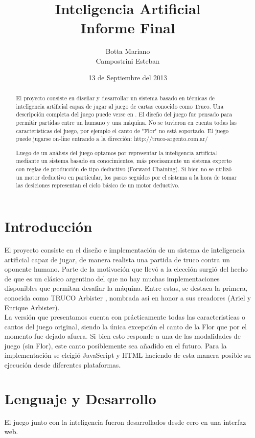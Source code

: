 \documentclass[12pt,a4paper]{article}
\title{Inteligencia Artificial\\ 
\large Informe Final
}
\author{Botta Mariano \\ Campostrini Esteban}
\date{ \small 13 de Septiembre del 2013}
\begin{document}
\maketitle 

\begin{abstract}
El proyecto consiste en dise\~nar y desarrollar un sistema basado en t\'ecnicas de inteligencia artificial capaz de jugar al 
juego de cartas conocido como Truco.
Una descripci\'on completa del juego puede verse en \cite{reglas}. El dise\~no del juego fue pensado para permitir partidas 
entre un humano y una m\'aquina. No se tuvieron en cuenta todas las caracter\'isticas del juego, por ejemplo el canto de "Flor" 
no est\'a soportado. El juego puede jugarse on-line entrando a la direcci\'on: http://truco-argento.com.ar/

Luego de un an\'alisis del juego optamos por representar la inteligencia artificial mediante un sistema basado en conocimientos, 
m\'as precisamente un sistema experto con reglas de producci\'on de tipo deductivo (Forward Chaining). Si bien no se utiliz\'o un motor
deductivo en particular, los pasos seguidos por el sistema a la hora de tomar las desiciones representan el ciclo b\'asico de un motor deductivo.
\end{abstract}
\pagebreak

\section{Introducci\'on}
El proyecto consiste en el dise\~no e implementaci\'on de un sistema de inteligencia artificial capaz de jugar, de manera realista
una partida de truco contra un oponente humano. Parte de la motivaci\'on que llev\'o a la elecci\'on surgi\'o del hecho de
que es un cl\'asico argentino del que no hay muchas implementaciones disponibles que permitan desafiar la m\'aquina. Entre
estas, se destaca la primera, conocida como TRUCO Arbister \cite{arbister}, nombrada asi en honor a sus creadores (Ariel y Enrique Arbister).\\
La versi\'on que presentamos cuenta con pr\'acticamente todas las caracteristicas o cantos del juego original, siendo la
\'unica excepci\'on el canto de la Flor que por el momento fue dejado afuera. Si bien esto responde a una de las modalidades de 
juego (sin Flor), este canto posiblemente sea a\~nadido en el futuro.
Para la implementaci\'on se eleigi\'o JavaScript y HTML haciendo de esta manera posible su ejecuci\'on desde diferentes plataformas. 


\section{Lenguaje y Desarrollo}
El juego junto con la inteligencia fueron desarrollados desde cero en una interfaz web. 
\end{document}
